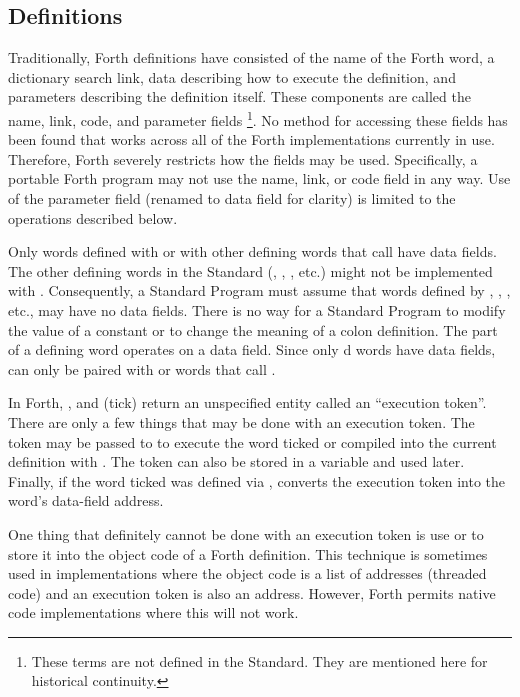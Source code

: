 \subsection{Definitions} %

Traditionally, Forth definitions have consisted of the name of the
Forth word, a dictionary search link, data describing how to execute
the definition, and parameters describing the definition itself. These
components are called the name, link, code, and parameter fields%
\footnote{These terms are not defined in the Standard.
They are mentioned here for historical continuity.
}. No method for accessing these fields has been found that works
across all of the Forth implementations currently in use. Therefore,
 Forth severely restricts how the fields may be used. Specifically,
a portable  Forth program may not use the name, link, or code field
in any way. Use of the parameter field (renamed to data field for
clarity) is limited to the operations described below.

Only words defined with  or with other defining words
that call  have data fields. The other defining words
in the Standard (, , \word{:}, etc.)
might not be implemented with . Consequently, a Standard
Program must assume that words defined by ,
, \word{:}, etc., may have no data fields. There is no
way for a Standard Program to modify the value of a constant or to
change the meaning of a colon definition. The  part of a
defining word operates on a data field. Since only d words
have data fields,  can only be paired with  or
words that call .

In  Forth, , \word{[']} and  (tick) return an
unspecified entity called an ``execution token''. There are only a
few things that may be done with an execution token. The token may be
passed to  to execute the word ticked or compiled into
the current definition with . The token can also be
stored in a variable and used later. Finally, if the word ticked was
defined via ,  converts the execution token
into the word's data-field address.

One thing that definitely cannot be done with an execution token is
use \word{!} or \word{,} to store it into the object code of a Forth
definition. This technique is sometimes used in implementations where
the object code is a list of addresses (threaded code) and an execution
token is also an address. However,  Forth permits native code
implementations where this will not work.


